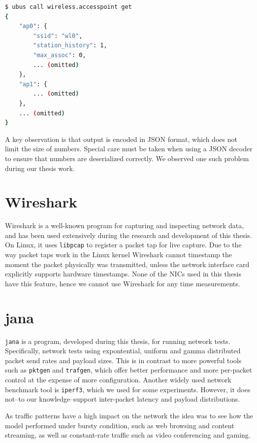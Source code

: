 \begin{lstlisting}[language=bash,caption={ubus call listing all access points on this device},label=lst:ubusex]
$ ubus call wireless.accesspoint get
{
    "ap0": {
        "ssid": "wl0",
        "station_history": 1,
        "max_assoc": 0,
        ... (omitted)
    },
    "ap1": {
        ... (omitted)
    },
    ... (omitted)
}
\end{lstlisting}

A key observation is that output is encoded in JSON format, which does not limit
the size of numbers. Special care must be taken when using a JSON decoder to
ensure that numbers are deserialized correctly. We observed one such problem
during our thesis work.

\section{Wireshark}

Wireshark is a well-known program for capturing and inspecting network data,
and has been used extensively during the research and development of this
thesis. On Linux, it uses \texttt{libpcap} to register a packet tap for live
capture. Due to the way packet taps work in the Linux kernel Wireshark cannot
timestamp the moment the packet physically was transmitted, unless the network
interface card explicitly supports hardware timestamps. None of the NICs used
in this thesis have this feature, hence we cannot use Wireshark for any
time measurements.

\section{jana}

\texttt{jana} is a program, developed during this thesis, for running network
 tests. Specifically, network tests using expontential, uniform and gamma
 distributed packet send rates and payload sizes. This is in contrast to more
 powerful tools such as \texttt{pktgen} and \texttt{trafgen}, which offer
 better performance and more per-packet control at the expense of more
 configuration. Another widely used network benchmark tool is \texttt
 {iperf3}, which we used for some experiments. However, it does not--to our
 knowledge--support inter-packet latency and payload distributions.

As traffic patterns have a high impact on the network the idea was to see how
the model performed under bursty condition, such as web browsing and content
streaming, as well as constant-rate traffic such as video conferencing and
gaming.


